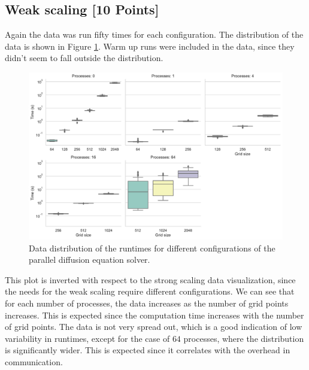 \documentclass[unicode,11pt,a4paper,oneside,numbers=endperiod,openany]{scrartcl}
\begin{document}
\subsection{Weak scaling [10 Points]}
Again the data was run fifty times for each configuration. The distribution of
the data is shown in Figure \ref{fig:data_weak}. Warm up runs were included in
the data, since they didn't seem to fall outside the distribution.
\begin{figure}[h!]
    \centering
    \includegraphics[width=\textwidth]{../mini_app/data_var_weak.pdf}
    \caption{Data distribution of the runtimes for different configurations of
    the parallel diffusion equation solver.}
    \label{fig:data_weak}
\end{figure}
This plot is inverted with respect to the strong scaling data visualization,
since the needs for the weak scaling require different configurations.
We can see that for each number of processes, the data increases as the number
of grid points increases. This is expected since the computation time increases
with the number of grid points. The data is not very spread out, which is
a good indication of low variability in runtimes, except for the case of $64$
processes, where the distribution is significantly wider. This is expected since
it correlates with the overhead in communication.
\end{document}
